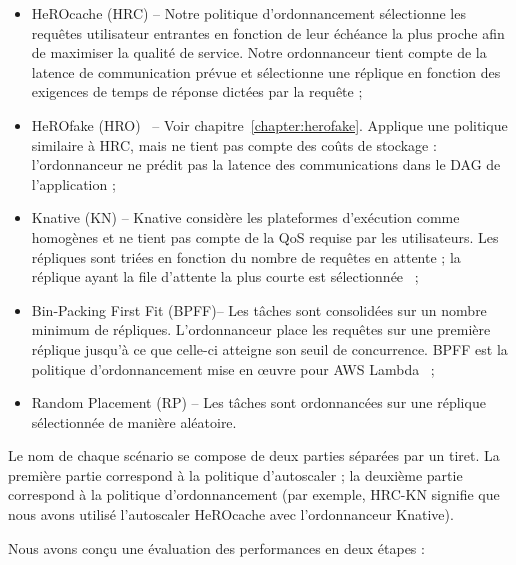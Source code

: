 {\begin{itemize}
    \item HeROcache (HRC) -- Notre politique d'ordonnancement sélectionne les requêtes utilisateur entrantes en fonction de leur échéance la plus proche afin de maximiser la qualité de service. Notre ordonnanceur tient compte de la latence de communication prévue et sélectionne une réplique en fonction des exigences de temps de réponse dictées par la requête ;
    \item HeROfake (HRO)~\cite{herofake} -- Voir chapitre~\ref{chapter:herofake}. Applique une politique similaire à HRC, mais ne tient pas compte des coûts de stockage : l'ordonnanceur ne prédit pas la latence des communications dans le DAG de l'application ;
    \item Knative (KN) -- Knative considère les plateformes d'exécution comme homogènes et ne tient pas compte de la \gls{QoS} requise par les utilisateurs. Les répliques sont triées en fonction du nombre de requêtes en attente ; la réplique ayant la file d'attente la plus courte est sélectionnée~\cite{sureshENSUREEfficientScheduling2020} ;
    \item Bin-Packing First Fit (BPFF)-- Les tâches sont consolidées sur un nombre minimum de répliques. L'ordonnanceur place les requêtes sur une première réplique jusqu'à ce que celle-ci atteigne son seuil de concurrence. BPFF est la politique d'ordonnancement mise en œuvre pour AWS Lambda~\cite{wangPeekingCurtainsServerlessb} ;
    \item Random Placement (RP) -- Les tâches sont ordonnancées sur une réplique sélectionnée de manière aléatoire.
\end{itemize}

Le nom de chaque scénario se compose de deux parties séparées par un tiret. La première partie correspond à la politique d'autoscaler ; la deuxième partie correspond à la politique d'ordonnancement (par exemple, HRC-KN signifie que nous avons utilisé l'autoscaler HeROcache avec l'ordonnanceur Knative).

Nous avons conçu une évaluation des performances en deux étapes :

}
